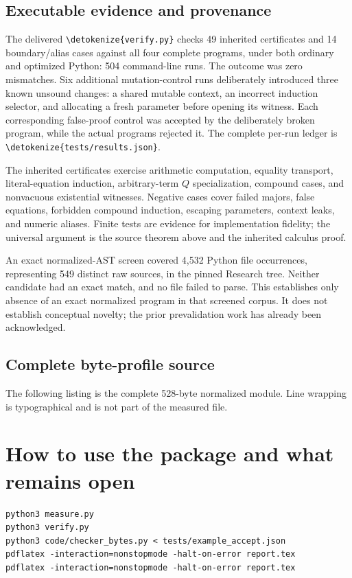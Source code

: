 \documentclass[11pt,letterpaper]{article}
\theoremstyle{definition}
\theoremstyle{remark}
\newcommand{\file}[1]{\expandafter\nolinkurl\expandafter{\detokenize{#1}}}
\begin{document}
\subsection{Executable evidence and provenance}

The delivered \file{verify.py} checks 49 inherited certificates and 14
boundary/alias cases against all four complete programs, under both
ordinary and optimized Python: 504 command-line runs. The outcome was
zero mismatches. Six additional mutation-control runs deliberately
introduced three known unsound changes: a shared mutable context,
an incorrect induction selector, and allocating a fresh parameter before
opening its witness. Each corresponding false-proof control was accepted
by the deliberately broken program, while the actual programs rejected it.
The complete per-run ledger is \file{tests/results.json}.

The inherited certificates exercise arithmetic computation, equality
transport, literal-equation induction, arbitrary-term $Q$ specialization,
compound cases, and nonvacuous existential witnesses. Negative cases cover
failed majors, false equations, forbidden compound induction, escaping
parameters, context leaks, and numeric aliases. Finite tests are evidence
for implementation fidelity; the universal argument is the source theorem
above and the inherited calculus proof.

An exact normalized-AST screen covered 4,532 Python file occurrences,
representing 549 distinct raw sources, in the pinned Research tree.
Neither candidate had an exact match, and no file failed to parse.
This establishes only absence of an exact normalized program in that
screened corpus. It does not establish conceptual novelty; the prior
prevalidation work has already been acknowledged.

\subsection{Complete byte-profile source}

The following listing is the complete 528-byte normalized module. Line
wrapping is typographical and is not part of the measured file.

\section{How to use the package and what remains open}

\begin{lstlisting}
python3 measure.py
python3 verify.py
python3 code/checker_bytes.py < tests/example_accept.json
pdflatex -interaction=nonstopmode -halt-on-error report.tex
pdflatex -interaction=nonstopmode -halt-on-error report.tex
\end{lstlisting}
\end{document}
